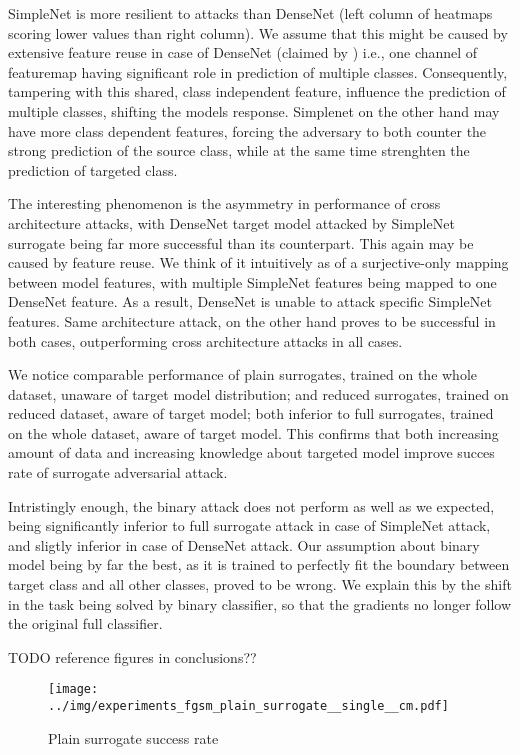 SimpleNet is more resilient to attacks than DenseNet (left column of heatmaps scoring lower values than right column). We assume that this might be caused by extensive feature reuse in case of DenseNet (claimed by \cite{DBLP:journals/corr/HuangLW16a}) i.e., one channel of featuremap having significant role in prediction of multiple classes. Consequently, tampering with this shared, class independent feature, influence the prediction of multiple classes, shifting the models response. Simplenet on the other hand may have more class dependent features, forcing the adversary to both counter the strong prediction of the source class, while at the same time strenghten the prediction of targeted class.

The interesting phenomenon is the asymmetry in performance of cross architecture attacks, with DenseNet target model attacked by SimpleNet surrogate being far more successful than its counterpart. This again may be caused by feature reuse. We think of it intuitively as of a surjective-only mapping between model features, with multiple SimpleNet features being mapped to one DenseNet feature. As a result, DenseNet is unable to attack specific SimpleNet features. Same architecture attack, on the other hand proves to be successful in both cases, outperforming cross architecture attacks in all cases.

We notice comparable performance of plain surrogates, trained on the whole dataset, unaware of target model distribution; and reduced surrogates, trained on reduced dataset, aware of target model; both inferior to full surrogates, trained on the whole dataset, aware of target model. This confirms that both increasing amount of data and increasing knowledge about targeted model improve succes rate of surrogate adversarial attack.

Intristingly enough, the binary attack does not perform as well as we expected, being significantly inferior to full surrogate attack in case of SimpleNet attack, and sligtly inferior in case of DenseNet attack. Our assumption about binary model being by far the best, as it is trained to perfectly fit the boundary between target class and all other classes, proved to be wrong. We explain this by the shift in the task being solved by binary classifier, so that the gradients no longer follow the original full classifier.

TODO reference figures in conclusions??

\begin{figure}
    \centering
    \texttt{[image: ../img/experiments\_fgsm\_plain\_surrogate\_\_single\_\_cm.pdf]}
    \caption{Plain surrogate success rate}
    \label{fig:plain_surrogate}
\end{figure}

